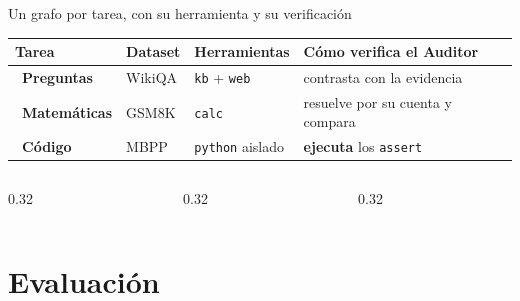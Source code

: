 \documentclass[aspectratio=1610, 11pt]{beamer}
\newcommand{\tarea}[5]{\textcolor{cAcc}{#1}\ \textbf{#2} & #3 & #4 & #5 \\}
\begin{document}
\begin{frame}{Un grafo por tarea, con su herramienta y su verificación}
  \vspace{2mm}
  {\small
  \renewcommand{\arraystretch}{1.55}
  \begin{tabular}{@{}>{\raggedright\arraybackslash}m{30mm}>{\raggedright\arraybackslash}m{20mm}>{\raggedright\arraybackslash}m{28mm}>{\raggedright\arraybackslash}m{48mm}@{}}
    \toprule
    \textcolor{cSrc}{\footnotesize Tarea} & \textcolor{cSrc}{\footnotesize Dataset} & \textcolor{cSrc}{\footnotesize Herramientas} & \textcolor{cSrc}{\footnotesize Cómo verifica el Auditor} \\
    \midrule
    \tarea{\faQuestionCircle}{Preguntas}{WikiQA}{\texttt{kb} + \texttt{web}}{contrasta con la evidencia}
    \tarea{\faCalculator}{Matemáticas}{GSM8K}{\texttt{calc}}{resuelve por su cuenta y compara}
    \tarea{\faCode}{Código}{MBPP}{\texttt{python} aislado}{\textbf{ejecuta} los \texttt{assert}}
    \bottomrule
  \end{tabular}\par}
  \vspace{7mm}
  \begin{columns}[T,onlytextwidth]
    \begin{column}{0.32\textwidth}\end{column}
    \begin{column}{0.32\textwidth}\end{column}
    \begin{column}{0.32\textwidth}\end{column}
  \end{columns}
\end{frame}

\section{Evaluación}
\end{document}

